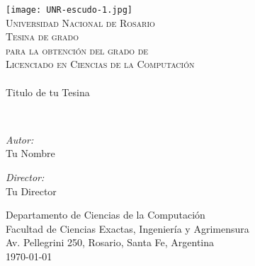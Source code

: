 {%
\thispagestyle{empty}
\begin{center}
    \texttt{[image: UNR-escudo-1.jpg]}
    \\[0.5cm]
    \textsc{\LARGE Universidad Nacional de Rosario}\\[1.5cm]

    \textsc{{\Large Tesina de grado} \\ para la obtención del grado de \\
     Licenciado en Ciencias de la Computación}\\[0.5cm]
    \HRule{} \\[0.4cm] %
        {\huge Titulo de tu Tesina \\[0.4cm]}

    \HRule{} \\[0.4cm] %
    \noindent
    \begin{minipage}{0.4\textwidth}
        \begin{flushleft} \large
            \emph{Autor:}\\
            Tu Nombre
        \end{flushleft}
        \end{minipage}%
        \begin{minipage}{0.4\textwidth}
        \begin{flushright} \large
            \emph{Director:} \\
            Tu Director \\
        \end{flushright}
    \end{minipage}

\vfill

Departamento de Ciencias de la Computación\\
Facultad de Ciencias Exactas, Ingeniería y Agrimensura\\
Av. Pellegrini 250, Rosario, Santa Fe, Argentina\\[0.4cm]
{\large \today}

\end{center}
\clearpage
}
